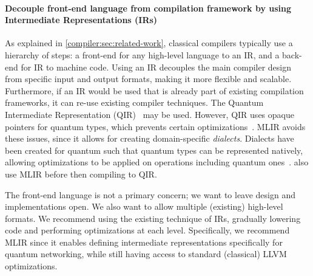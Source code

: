 \paragraph{Decouple front-end language from compilation framework by using Intermediate Representations (IRs)}

As explained in \cref{compiler:sec:related-work}, classical compilers typically use a hierarchy of steps: a front-end for any high-level language to an \acf{IR}, and a back-end for \ac{IR} to machine code.
Using an \ac{IR} decouples the main compiler design from specific input and output formats, making it more flexible and scalable.
Furthermore, if an \ac{IR} would be used that is already part of existing compilation frameworks, it can re-use existing compiler techniques.
The Quantum Intermediate Representation (QIR)~\cite{haner_software_2018, geller_introducing_2020} may be used.
However, QIR uses opaque pointers for quantum types, which prevents certain optimizations~\cite{ittah_enabling_2022, peduri_qssa_2022}.
\acf{MLIR} avoids these issues, since it allows for creating domain-specific \emph{dialects}.
Dialects have been created for quantum such that quantum types can be represented natively, allowing optimizations to be applied on operations including quantum ones~\cite{ittah_enabling_2022, peduri_qssa_2022}.
\cite{mccaskey_mlir_2021, nguyen_retargetable_2022} also use \ac{MLIR} before then compiling to QIR.

The front-end language is not a primary concern; we want to leave design and implementations open.
We also want to allow multiple (existing) high-level formats.
We recommend using the existing technique of IRs, gradually lowering code and performing optimizations at each level.
Specifically, we recommend \ac{MLIR} since it enables defining intermediate representations specifically for quantum networking, while still having access to standard (classical) LLVM optimizations.

